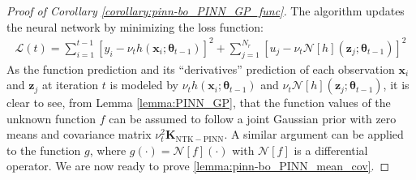\begin{proof}[Proof of Corollary  \ref{corollary:pinn-bo_PINN_GP_func}]
The algorithm updates the neural network by minimizing the loss function: \begin{align*}
    \mathcal{L}(t) = \sum^{t-1}_{i=1} [y_i - \nu_t h(\mathbf{x}_i; \boldsymbol{\theta}_{t-1})]^2 + \sum^{N_r}_{j=1}[u_j - \nu_t \mathcal{N}[h](\mathbf{z}_j; \boldsymbol{\theta}_{t-1})]^2
\end{align*} 
As the function prediction and its ``derivatives'' prediction of each observation $\mathbf{x}_i$ and $\mathbf{z}_j$ at iteration $t$ is modeled by $\nu_t h(\mathbf{x}_i; \boldsymbol{\theta}_{t-1})$ and $\nu_t \mathcal{N}[h](\mathbf{z}_j; \boldsymbol{\theta}_{t-1})$, it is clear to see, from Lemma \ref{lemma:PINN_GP}, that the function values of the unknown function $f$ can be assumed to follow a joint Gaussian prior with zero means and covariance matrix $\nu_t^2 \mathbf{K}_\mathrm{NTK-PINN}$. A similar argument can be applied to the function $g$, where $g(\cdot) = \mathcal{N}[f] (\cdot)$ with $\mathcal{N}[f]$ is a differential operator. We are now ready to prove \ref{lemma:pinn-bo_PINN_mean_cov}.
\end{proof} 
